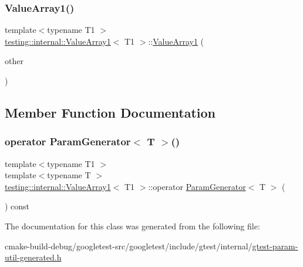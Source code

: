 \mbox{\label{classtesting_1_1internal_1_1ValueArray1_a54a3968da3354334cb4d730f5254e216}} 
\subsubsection{\texorpdfstring{ValueArray1()}{ValueArray1()}\hspace{0.1cm}{\footnotesize\ttfamily [2/2]}}
{\footnotesize\ttfamily template$<$typename T1 $>$ \\
\mbox{\hyperlink{classtesting_1_1internal_1_1ValueArray1}{testing\+::internal\+::\+Value\+Array1}}$<$ T1 $>$\+::\mbox{\hyperlink{classtesting_1_1internal_1_1ValueArray1}{Value\+Array1}} (\begin{DoxyParamCaption}\item[{const \mbox{\hyperlink{classtesting_1_1internal_1_1ValueArray1}{Value\+Array1}}$<$ T1 $>$ \&}]{other }\end{DoxyParamCaption})\hspace{0.3cm}{\ttfamily [inline]}}



\subsection{Member Function Documentation}
\mbox{\label{classtesting_1_1internal_1_1ValueArray1_a1ffe0a28fd09efa980df1aaa3f7af2a0}} 
\subsubsection{\texorpdfstring{operator ParamGenerator$<$ T $>$()}{operator ParamGenerator< T >()}}
{\footnotesize\ttfamily template$<$typename T1 $>$ \\
template$<$typename T $>$ \\
\mbox{\hyperlink{classtesting_1_1internal_1_1ValueArray1}{testing\+::internal\+::\+Value\+Array1}}$<$ T1 $>$\+::operator \mbox{\hyperlink{classtesting_1_1internal_1_1ParamGenerator}{Param\+Generator}}$<$ T $>$ (\begin{DoxyParamCaption}{ }\end{DoxyParamCaption}) const\hspace{0.3cm}{\ttfamily [inline]}}



The documentation for this class was generated from the following file\+:\begin{DoxyCompactItemize}
\item 
cmake-\/build-\/debug/googletest-\/src/googletest/include/gtest/internal/\mbox{\hyperlink{gtest-param-util-generated_8h}{gtest-\/param-\/util-\/generated.\+h}}\end{DoxyCompactItemize}
